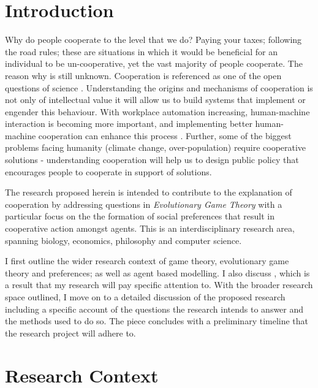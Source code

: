 \documentclass[11pt]{article}
\newcommand*{\np}{\par\noindent\newline}
\begin{document}
\newpage
\tableofcontents
\newpage
\section{Introduction}\label{intro}
Why do people cooperate to the level that we do? Paying your taxes; following
the road rules; these are situations in which it would be beneficial for an
individual to be un-cooperative, yet the vast majority of people cooperate. The
reason why is still unknown. Cooperation is referenced as one of the open
questions of science \cite{pennisi_how_2005}. Understanding the origins and
mechanisms of cooperation is not only of intellectual value it will allow us to
build systems that implement or engender this behaviour. With workplace
automation increasing, human-machine interaction is becoming more important,
and implementing better human-machine cooperation can enhance this process
\cite{hoc_human_2000}. Further, some of the biggest problems facing humanity
(climate change, over-population) require cooperative solutions - understanding
cooperation will help us to design public policy that encourages people to
cooperate in support of solutions.

\np The research proposed herein is intended to contribute to the explanation
of cooperation by addressing questions in \textit{Evolutionary Game Theory}
with a particular focus on the the formation of social preferences that result
in cooperative action amongst agents. This is an interdisciplinary research
area, spanning biology, economics, philosophy and computer science.

\np I first outline the wider research context of game theory, evolutionary
game theory and preferences; as well as agent based modelling. I also discuss
\cite{alger_homo_2013}, which is a result that my research will pay specific
attention to. With the broader research space outlined, I move on to a detailed
discussion of the proposed research including a specific account of the
questions the research intends to answer and the methods used to do so. The
piece concludes with a preliminary timeline that the research project will
adhere to.
\section{Research Context}
\end{document}
